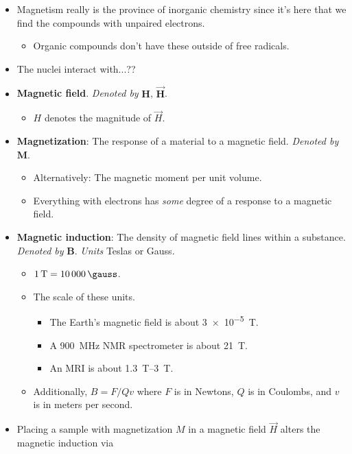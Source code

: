 \documentclass[../notes.tex]{subfiles}
\begin{document}
\begin{itemize}
\begin{itemize}
    \end{itemize}
    \item Magnetism really is the province of inorganic chemistry since it's here that we find the compounds with unpaired electrons.
    \begin{itemize}
        \item Organic compounds don't have these outside of free radicals.
    \end{itemize}
    \item The nuclei interact with...??
    \item \textbf{Magnetic field}. \emph{Denoted by} $\bm{H}$, $\bm{\vec{H}}$.
    \begin{itemize}
        \item $H$ denotes the magnitude of $\vec{H}$.
    \end{itemize}
    \item \textbf{Magnetization}: The response of a material to a magnetic field. \emph{Denoted by} $\bm{M}$.
    \begin{itemize}
        \item Alternatively: The magnetic moment per unit volume.
        \item Everything with electrons has \emph{some} degree of a response to a magnetic field.
    \end{itemize}
    \item \textbf{Magnetic induction}: The density of magnetic field lines within a substance. \emph{Denoted by} $\bm{B}$. \emph{Units} Teslas or Gauss.
    \begin{itemize}
        \item $\SI{1}{\tesla}=\SI{10000}{\gauss}$.
        \item The scale of these units.
        \begin{itemize}
            \item The Earth's magnetic field is about \SI{3e-5}{\tesla}.
            \item A \SI{900}{\mega\hertz} NMR spectrometer is about \SI{21}{\tesla}.
            \item An MRI is about \SIrange{1.3}{3}{\tesla}.
        \end{itemize}
        \item Additionally, $B=F/Qv$ where $F$ is in Newtons, $Q$ is in Coulombs, and $v$ is in meters per second.
    \end{itemize}
    \item Placing a sample with magnetization $M$ in a magnetic field $\vec{H}$ alters the magnetic induction via

\end{itemize}
\end{document}
